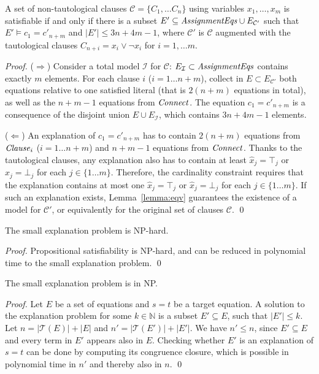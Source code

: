 \documentclass[smallextended]{svjour3}
\newcommand{\Assignment}{{\it AssignmentEqs}}
\newcommand{\Clause}{{\it Clause}}
\newcommand{\Connect}{{\it Connect}}
\begin{document}
\begin{lemma}
A set of non-tautological clauses $\mathcal{C}= \{C_1, \dots C_n\}$ using
variables $x_1,\dots, x_m$ is satisfiable if and only if there is a subset $E'
\subseteq \Assignment \cup E_{\mathcal{C}'}$ such that $E'\models
c_1 = c'_{n+m}$ and $|E'| \leq 3n+4m-1$, where $\mathcal{C}'$ is
$\mathcal{C}$ augmented with the tautological clauses $C_{n+i} = x_i \vee \neg
x_i$ for $i=1,\dots m$.
\end{lemma}
\begin{proof}
($\Rightarrow$)  Consider a total model $\mathcal{I}$ for
$\mathcal{C}$: $E_{\mathcal{I}} \subset \Assignment$ contains exactly $m$
elements.  For each clause $i$ ($i= 1\dots n + m$), collect in $E\subset
E_{\mathcal{C}'}$ both equations relative to one satisfied literal (that is $2(n
+m)$ equations in total), as well as the $n + m - 1$ equations from $\Connect$.
The equation $c_1 = c'_{n+m}$ is a consequence of the disjoint union
$E \cup E_{\mathcal{I}}$, which contains $3n + 4m - 1$ elements.

($\Leftarrow$)  An explanation of $c_1 = c'_{n+m}$ has to contain $2(n + m)$ equations from $\Clause_i$ 
($i= 1\dots n + m$) and $n + m - 1$ equations from $\Connect$.  Thanks to the tautological
clauses, any explanation also has to contain at least $\hat{x}_j = \top_j$ or
$\hat{x}_j = \bot_j$ for each $j\in\{1\dots m\}$.  Therefore, the cardinality
constraint requires that the explanation contains at most one $\hat{x}_j =
\top_j$ or $\hat{x}_j = \bot_j$ for each $j\in\{1\dots m\}$.  If such an
explanation exists, Lemma~\ref{lemma:eqv} guarantees the existence of a model
for $\mathcal{C'}$, or equivalently for the original set of clauses
$\mathcal{C}$.
\qed
\end{proof}

\begin{corollary}[NP-hardness]
\label{lemma:nphardness}
The small explanation problem is NP-hard.
\end{corollary}
\begin{proof}
Propositional satisfiability is NP-hard, and can be reduced in polynomial time to the small explanation problem.
\qed
\end{proof}

\begin{lemma}[NP]
\label{lemma:innp}
The small explanation problem is in NP.
\end{lemma}
\begin{proof}
Let $E$ be a set of equations and $s=t$ be a target equation.
A solution to the explanation problem for some $k \in \mathbb{N}$ is a subset $E' \subseteq E$, such that $|E'| \leq k$.
Let $n = |\mathcal{T}(E)| + |E|$ and $n' = |\mathcal{T}(E')| + |E'|$.
We have $n' \leq n$, since $E' \subseteq E$ and every term in $E'$ appears also in $E$.
Checking whether $E'$ is an explanation of $s=t$ can be done by computing its congruence closure, which is possible in polynomial time in $n'$ \cite{Nelson2} and thereby also in $n$.
\qed
\end{proof}
\end{document}
